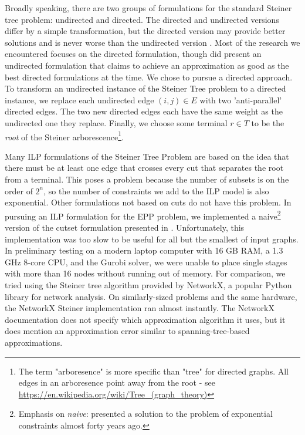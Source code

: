 \documentclass{acmart}
\begin{document}
 	Broadly speaking, there are two groups of formulations for the standard Steiner tree problem: undirected and directed. The directed and undirected versions differ by a simple transformation, but the directed version may provide better solutions and is never worse than the undirected version \cite{rao1988steiner}. Most of the research we encountered focuses on the directed formulation, though \cite{Goemans1993ACO} did present an undirected formulation that claims to achieve an approximation as good as the best directed formulations at the time. We chose to pursue a directed approach.
 	To transform an undirected instance of the Steiner Tree problem to a directed instance, we replace each undirected edge $(i,j) \in E$ with two 'anti-parallel' directed edges. The two new directed edges each have the same weight as the undirected one they replace. Finally, we choose some terminal $r \in T$ to be the \textit{root} of the Steiner arborescence\footnote{The term "arboresence" is more specific than "tree" for directed graphs. All edges in an arboresence point away from the root - see \url{https://en.wikipedia.org/wiki/Tree_(graph_theory)}}. 
 	
 	Many ILP formulations of the Steiner Tree Problem are based on the idea that there must be at least one edge that crosses every cut that separates the root from a terminal. This poses a problem because the number of subsets is on the order of $2^n$, so the number of constraints we add to the ILP model is also exponential. Other formulations not based on cuts do not have this problem. In pursuing an ILP formulation for the EPP problem, we implemented a naive\footnote{Emphasis on \textit{naive}: \cite{Aneja1980AnIL} presented a solution to the problem of exponential constraints almost forty years ago.}  version of the cutset formulation presented in \cite{Koch1998SolvingST}. Unfortunately, this implementation was too slow to be useful for all but the smallest of input graphs. In preliminary testing on a modern laptop computer with 16 GB RAM, a 1.3 GHz 8-core CPU, and the Gurobi solver, we were unable to place single stages with more than 16 nodes without running out of memory. For comparison, we tried using the Steiner tree algorithm provided by NetworkX, a popular Python library for network analysis\cite{networkx}. On similarly-sized problems and the same hardware, the NetworkX Steiner implementation ran almost instantly. The NetworkX documentation does not specify which approximation algorithm it uses, but it does mention an approximation error similar to spanning-tree-based approximations.
 	
\end{document}
